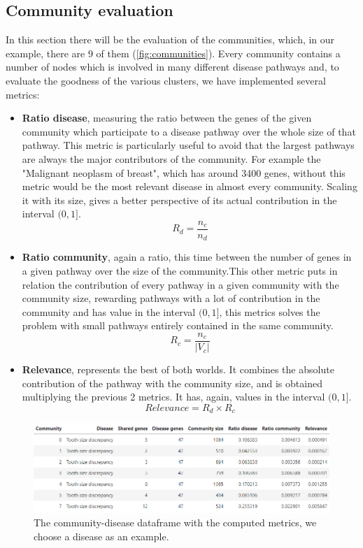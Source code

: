 \subsection{Community evaluation}\label{subsec:community_evaluation}
In this section there will be the evaluation of the communities, which, in our example, there are $9$ of them (\autoref{fig:communities}). Every community contains a number of nodes which is involved in many different disease pathways and, to evaluate the goodness of the various clusters, we have implemented several metrics:
\begin{itemize}
    \item \textbf{Ratio disease}, measuring the ratio between the genes of the given community which participate to a disease pathway over the whole size of that pathway. This metric is particularly useful to avoid that the largest pathways are always the major contributors of the community. For example the "Malignant neoplasm of breast", which has around 3400 genes, without this metric would be the most relevant disease in almost every community. Scaling it with its size, gives a better perspective of its actual contribution in the interval $(0,1]$.
    \begin{equation}
        R_d = \frac{n_c}{n_d}
        \label{eq:ratio_disease}
    \end{equation}
    \item \textbf{Ratio community}, again a ratio, this time between the number of genes in a given pathway over the size of the community.This other metric puts in relation the contribution of every pathway in a given community with the community size, rewarding pathways with a lot of contribution in the community and has value in the interval $(0,1]$, this metrics solves the problem with small pathways entirely contained in the same community.
    \begin{equation}
        R_c = \frac{n_c}{|V_c|}
    \end{equation}
    \item \textbf{Relevance}, represents the best of both worlds. It combines the absolute contribution of the pathway with the community size, and is obtained multiplying the previous 2 metrics. It has, again, values in the interval $(0,1]$. 
    \begin{equation}
        Relevance = R_d \times R_c
    \end{equation}
\end{itemize}
\begin{figure}[H]
    \centering
    \includegraphics[width=1\linewidth]{images/disease_community_metrics.png}
    \caption{The community-disease dataframe with the computed metrics, we choose a disease as an example.}
    \label{fig:disease_community_metrics}
\end{figure}
